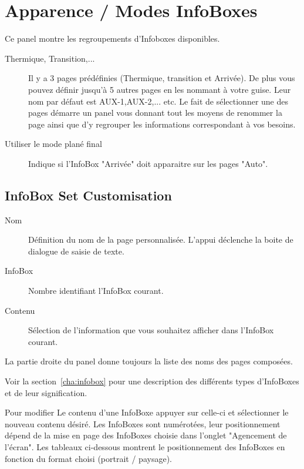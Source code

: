 \section{Apparence / Modes InfoBoxes}\label{sec:infobox_sets}

Ce panel montre les regroupements d'Infoboxes disponibles.

\begin{description}
\item[Thermique, Transition,...]  Il y a 3 pages prédéfinies (Thermique, transition et Arrivée). De plus vous pouvez définir jusqu'à 5 autres pages en les nommant à votre guise. Leur nom par défaut est AUX-1,AUX-2,... etc.
Le fait de sélectionner une des pages démarre un panel vous donnant tout les moyens de renommer la page ainsi que d'y regrouper les informations correspondant à vos besoins.
\item[Utiliser le mode plané final]  Indique si l'InfoBox "Arrivée" doit apparaitre sur les pages "Auto".
\end{description}


\subsection*{InfoBox Set Customisation}

\begin{description}
\item[Nom]  Définition du nom de la page personnalisée. L'appui déclenche la boite de dialogue de saisie de texte.
\item[InfoBox]  Nombre identifiant l'InfoBox courant.
\item[Contenu]  Sélection de l'information que vous souhaitez afficher dans l'InfoBox courant.
\end{description}

La partie droite du panel donne toujours la liste des noms des pages composées. 

Voir la section~\ref{cha:infobox} pour une description des différents types d'InfoBoxes et de leur signification.

Pour modifier Le contenu d'une InfoBoxe appuyer sur celle-ci et sélectionner le nouveau contenu désiré. Les InfoBoxes sont numérotées, leur positionnement dépend de la mise en page des InfoBoxes choisie dans l'onglet "Agencement de l'écran". Les tableaux ci-dessous montrent le positionnement des InfoBoxes en fonction du format choisi (portrait / paysage).


